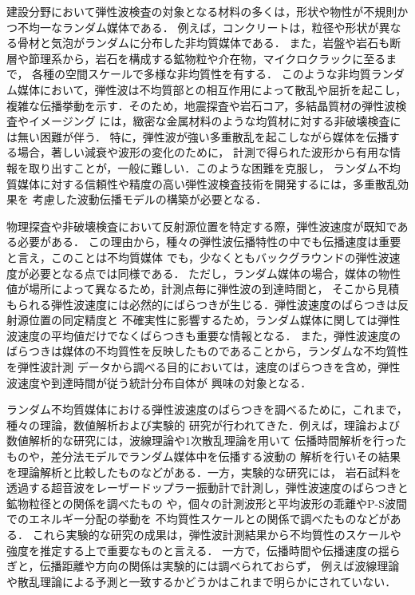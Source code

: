 建設分野において弾性波検査の対象となる材料の多くは，形状や物性が不規則かつ不均一なランダム媒体である．
例えば，コンクリートは，粒径や形状が異なる骨材と気泡がランダムに分布した非均質媒体である．
また，岩盤や岩石も断層や節理系から，岩石を構成する鉱物粒や介在物，マイクロクラックに至るまで，
各種の空間スケールで多様な非均質性を有する\cite{RockPhys}．
このような非均質ランダム媒体において，弾性波は不均質部との相互作用によって散乱や屈折を起こし，
複雑な伝播挙動を示す．そのため，地震探査や岩石コア，多結晶質材の弾性波検査やイメージング
には，緻密な金属材料のような均質材に対する非破壊検査には無い困難が伴う\cite{Sato,Borcea,Thompson}．
特に，弾性波が強い多重散乱を起こしながら媒体を伝播する場合，著しい減衰や波形の変化のために，
計測で得られた波形から有用な情報を取り出すことが，一般に難しい．このような困難を克服し，
ランダム不均質媒体に対する信頼性や精度の高い弾性波検査技術を開発するには，多重散乱効果を
考慮した波動伝播モデルの構築が必要となる．

物理探査や非破壊検査において反射源位置を特定する際，弾性波速度が既知である必要がある\cite{Etgen, Schmitz}．
この理由から，種々の弾性波伝播特性の中でも伝播速度は重要と言え，このことは不均質媒体
でも，少なくともバックグラウンドの弾性波速度が必要となる点では同様である\cite{Langenberg, Bleistein}．
ただし，ランダム媒体の場合，媒体の物性値が場所によって異なるため，計測点毎に弾性波の到達時間と，
そこから見積もられる弾性波速度には必然的にばらつきが生じる．弾性波速度のばらつきは反射源位置の同定精度と
不確実性に影響するため，ランダム媒体に関しては弾性波速度の平均値だけでなくばらつきも重要な情報となる．
また，弾性波速度のばらつきは媒体の不均質性を反映したものであることから，ランダムな不均質性を弾性波計測
データから調べる目的においては，速度のばらつきを含め，弾性波速度や到達時間が従う統計分布自体が
興味の対象となる\cite{Yu,Li}．

ランダム不均質媒体における弾性波速度のばらつきを調べるために，これまで，種々の理論，数値解析および実験的
研究が行われてきた\cite{NishizawaI}．例えば，理論および数値解析的な研究には，波線理論や1次散乱理論を用いて
伝播時間解析を行ったもの\cite{Muller, Korn, Spetzler2001}や，差分法モデルでランダム媒体中を伝播する波動の
解析を行いその結果を理論解析と比較したもの\cite{Spetzler}などがある．一方，実験的な研究には，
岩石試料を透過する超音波をレーザードップラー振動計で計測し，弾性波速度のばらつきと鉱物粒径との関係を調べたもの
\cite{Nishizawa1996,Nishizawa2001}や，個々の計測波形と平均波形の乖離やP-S波間でのエネルギー分配の挙動を
不均質性スケールとの関係で調べたものなど\cite{Sivaji,Fukushima}がある．
これら実験的な研究の成果は，弾性波計測結果から不均質性のスケールや強度を推定する上で重要なものと言える．
一方で，伝播時間や伝播速度の揺らぎと，伝播距離や方向の関係は実験的には調べられておらず，
例えば波線理論や散乱理論による予測と一致するかどうかはこれまで明らかにされていない．

